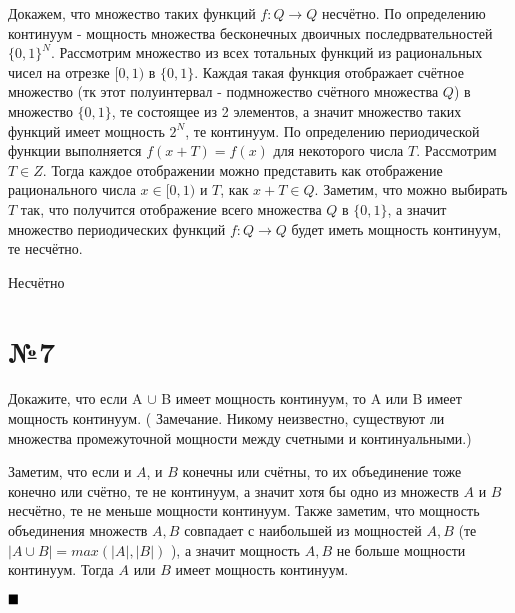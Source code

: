 \documentclass[a4paper, 16pt]{article}
\newenvironment{proof}[1][Доказательство]{%
	\begin{trivlist}
		\item[\hskip \labelsep {\bfseries #1:}]
		\item \hspace{14pt}
	}{
		$ \hfill\blacksquare $
	\end{trivlist}
	\hfill\break
}
\newenvironment{solution}[1][Решение]{%
	\begin{trivlist}
		\item[\hskip \labelsep {\bfseries #1:}]
		\item \hspace{15pt}
	}{
	\end{trivlist}
}
\begin{document}
		\begin{solution}
			Докажем, что множество таких функций $f: Q \rightarrow Q$ несчётно. По определению континуум - мощность множества бесконечных двоичных последрвательностей $\{0, 1\}^N$. Рассмотрим множество из всех тотальных функций из рациональных чисел на отрезке $[0, 1)$ в $\{0, 1\}$. Каждая такая функция отображает счётное множество (тк этот полуинтервал - подмножество счётного множества $Q$) в множество $\{0, 1\}$, те состоящее из 2 элементов, а значит множество таких функций имеет мощность $2^N$, те континуум. По определению периодической функции выполняется
			$f
			(
			x
			+
			T
			) =
			f
			(
			x
			)$ для некоторого числа $T$. Рассмотрим $T \in Z$. Тогда каждое отображении можно представить как отображение рационального числа $x \in [0, 1)$ и $T$, как $x + T \in Q$. Заметим, что можно выбирать $T$ так, что получится отображение всего множества $Q$ в $\{0, 1\}$, а значит  множество периодических функций
			$f
			:
			Q
			\rightarrow
			Q$ будет иметь мощность континуум, те несчётно.
		\end{solution}
	
		\begin{solution}
			Несчётно
		\end{solution}
	
	\section*{№7}
	
		Докажите, что если
		A
		$\cup$
		B
		имеет мощность континуум, то
		A
		или
		B
		имеет мощность континуум.
		(
		Замечание.
		Никому неизвестно, существуют ли множества промежуточной мощности между счетными
		и континуальными.)
		
		\begin{proof}
			Заметим, что если и $A$, и $B$ конечны или счётны, то их объединение тоже конечно или счётно, те не континуум, а значит хотя бы одно из множеств $A$ и $B$ несчётно, те не меньше мощности континуум. Также заметим, что мощность объединения множеств $A, B$ совпадает с наибольшей из мощностей $A, B$ (те $|A\cup B| = max(|A|, |B|)$ ), а значит мощность  $A, B$ не больше мощности континуум. Тогда $A$
			или
			$B$
			имеет мощность континуум.
		\end{proof}
	
	
	
	
	
	
	
	
	
	
	
	
	
	
\end{document}
